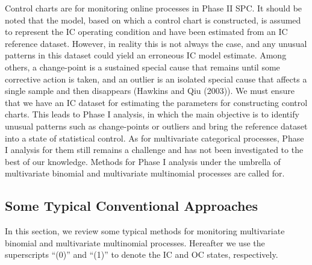 Control charts are for monitoring online processes in Phase II SPC. It should be
noted that the model, based on which a control chart is constructed, is assumed to
represent the IC operating condition and have been estimated from an IC reference
dataset. However, in reality this is not always the case, and any unusual patterns
in this dataset could yield an erroneous IC model estimate. Among others, a
change-point is a sustained special cause that remains until some corrective action
is taken, and an outlier is an isolated special cause that affects a single sample
and then disappears (Hawkins and Qiu (2003)). We must ensure that we have an IC
dataset for estimating the parameters for constructing control charts. This leads to
Phase I analysis, in which the main objective is to identify unusual patterns such
as change-points or outliers and bring the reference dataset into a state of
statistical control. As for multivariate categorical processes, Phase I analysis for
them still remains a challenge and has not been investigated to the best of our
knowledge. Methods for Phase I analysis under the umbrella of multivariate binomial
and multivariate multinomial processes are called for.



\subsection{Some Typical Conventional Approaches}

In this section, we review some typical methods for monitoring multivariate binomial
and multivariate multinomial processes. Hereafter we use the superscripts ``(0)''
and ``(1)'' to denote the IC and OC states, respectively.

